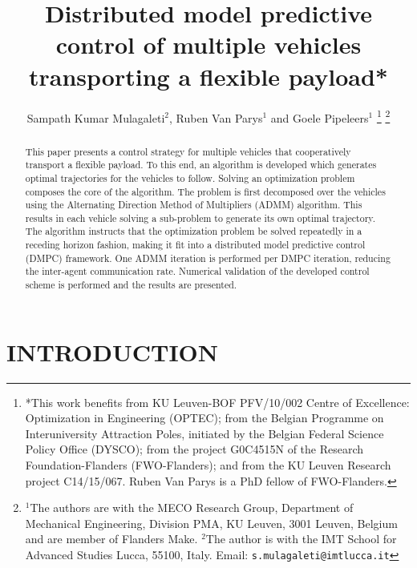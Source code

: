 \documentclass[letterpaper, 10 pt, conference]{ieeeconf}
\title{\LARGE \bf
Distributed model predictive control of multiple
vehicles transporting a flexible payload*
}
\author{Sampath Kumar Mulagaleti$^{2}$, Ruben Van Parys$^{1}$ and Goele Pipeleers$^{1}$%
\thanks{*This work benefits from KU Leuven-BOF PFV/10/002 Centre of Excellence: Optimization in Engineering (OPTEC); from the Belgian Programme on Interuniversity Attraction Poles, initiated by the Belgian Federal Science Policy Office (DYSCO); from the project G0C4515N of the Research Foundation-Flanders (FWO-Flanders); and from the KU Leuven Research project C14/15/067. Ruben Van Parys is a PhD fellow of FWO-Flanders. }%
\thanks{$^{1}$The authors are with the MECO Research Group, Department of Mechanical Engineering, Division PMA, KU Leuven, 3001 Leuven, Belgium and are member of Flanders Make. $^{2}$The author is with the IMT School for Advanced Studies Lucca, 55100, Italy. Email:
	 \texttt{s.mulagaleti@imtlucca.it}}
}
\begin{document}
\maketitle
\thispagestyle{empty}
\pagestyle{empty}


\begin{abstract}
This paper presents a control strategy for multiple vehicles that cooperatively transport a flexible payload. To this end, an algorithm is developed which generates optimal trajectories for the vehicles to follow. Solving an optimization problem composes the core of the algorithm. The problem is first decomposed over the vehicles using the Alternating Direction Method of Multipliers (ADMM) algorithm. This results in each vehicle solving a sub-problem to generate its own optimal trajectory. The algorithm instructs that the optimization problem be solved repeatedly in a receding horizon fashion, making it fit into a distributed model predictive control (DMPC) framework. One ADMM iteration is performed per DMPC iteration, reducing the inter-agent communication rate. Numerical validation of the developed control scheme is performed and the results are presented.
\end{abstract}


\section{INTRODUCTION}
\end{document}
